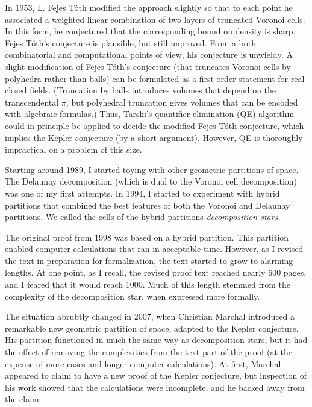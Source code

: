 \documentclass{amsart}
\begin{document}
In 1953, L. Fejes T\'oth modified the approach slightly so that to
each point he associated a weighted linear combination of two layers
of truncated Voronoi cells.  In this form, he conjectured that the
corresponding bound on density is sharp.  Fejes T\'oth's conjecture is
plausible, but still unproved.  From a both combinatorial and
computational points of view, his conjecture is unwieldy.  A slight
modification of Fejes T\'oth's conjecture (that truncates Voronoi
cells by polyhedra rather than balls) can be formulated as a
first-order statement for real-closed fields.  (Truncation by balls
introduces volumes that depend on the transcendental $\pi$, but
polyhedral truncation gives volumes that can be encoded with algebraic
formulas.)  Thus, Tarski's quantifier elimination (QE) algorithm could
in principle be applied to decide the modified Fejes T\'oth
conjecture, which implies the Kepler conjecture (by a short argument).
However, QE is thoroughly impractical on a problem of this size.

Starting around 1989, I started toying with other geometric partitions
of space.  The Delaunay decomposition (which is dual to the Voronoi
cell decomposition) was one of my first attempts.  In 1994, I started
to experiment with hybrid partitions that combined the best features
of both the Voronoi and Delaunay partitions.  We called the cells of
the hybrid partitions \emph{decomposition stars}.  

The original proof from 1998 was based on a hybrid partition.  This
partition enabled computer calculations that ran in acceptable time.
However, as I revised the text in preparation for formalization, the text
started to grow to alarming lengths.  At one point, as I recall, the
revised proof text reached nearly 600 pages, and I feared that it would
reach 1000.  Much of this length stemmed from the complexity of the
decomposition star, when expressed more formally.

The situation abrubtly changed in 2007, when Christian Marchal
introduced a remarkable new geometric partition of space, adapted to
the Kepler conjecture.  His partition functioned in much the same way
as decomposition stars, but it had the effect of removing the
complexities from the text part of the proof (at the expense of more
cases and longer computer calculations).  At first, Marchal appeared
to claim to have a new proof of the Kepler conjecture, but inspection
of his work showed that the calculations were incomplete, and he
backed away from the claim \cite{marchal:2007}.
\end{document}
